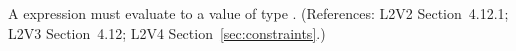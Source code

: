 A \Constraint {} expression must evaluate to a value of type
.  (References: L2V2 Section~4.12.1; L2V3
Section~4.12; L2V4 Section~\ref{sec:constraints}.)
